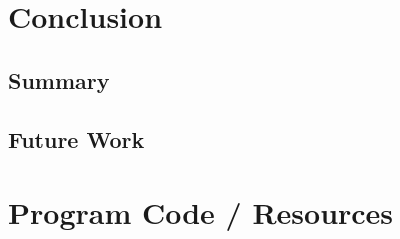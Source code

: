\documentclass[11pt,titlepage,oneside,openany]{book}
\begin{document}
%
%


\chapter{Conclusion}
\label{cha:conclusion}


\section{Summary}
\label{sec:sum}


\section{Future Work}
\label{sec:future}






\appendix

\chapter{Program Code / Resources}
\label{cha:appendix-a}
\end{document}
